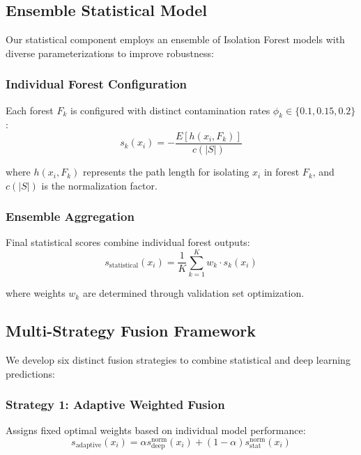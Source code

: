 \documentclass[conference]{IEEEtran}
\begin{document}
\subsection{Ensemble Statistical Model}

Our statistical component employs an ensemble of Isolation Forest models with diverse parameterizations to improve robustness:

\subsubsection{Individual Forest Configuration}
Each forest $F_k$ is configured with distinct contamination rates $\phi_k \in \{0.1, 0.15, 0.2\}$:
\begin{equation}
s_k(x_i) = -\frac{E[h(x_i, F_k)]}{c(|S|)}
\end{equation}

where $h(x_i, F_k)$ represents the path length for isolating $x_i$ in forest $F_k$, and $c(|S|)$ is the normalization factor.

\subsubsection{Ensemble Aggregation}
Final statistical scores combine individual forest outputs:
\begin{equation}
s_{\text{statistical}}(x_i) = \frac{1}{K} \sum_{k=1}^{K} w_k \cdot s_k(x_i)
\end{equation}

where weights $w_k$ are determined through validation set optimization.

\subsection{Multi-Strategy Fusion Framework}

We develop six distinct fusion strategies to combine statistical and deep learning predictions:

\subsubsection{Strategy 1: Adaptive Weighted Fusion}
Assigns fixed optimal weights based on individual model performance:
\begin{equation}
s_{\text{adaptive}}(x_i) = \alpha s_{\text{deep}}^{\text{norm}}(x_i) + (1-\alpha) s_{\text{stat}}^{\text{norm}}(x_i)
\end{equation}
\end{document}
